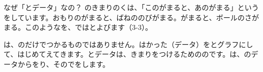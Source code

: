 \begin{column}{なぜ「とデータ」なの？}
のきまりのくは、「このがまると、あのがまる」というをしています。おもりのがまると、ばねののびがまる。がまると、ボールのさがまる。このようなを、では\textbf{}とよびます（3-3）。

は、のだけでつかるものではありません。はかった（データ）をとグラフにして、はじめてえてきます。とデータは、きまりをつけるためののです。は、のデータからをり、そのでをします。
\end{column}


